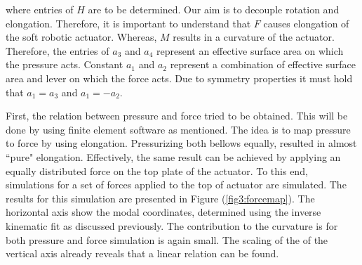 where entries of $H$ are to be determined. Our aim is to decouple rotation and elongation. Therefore, it is important to understand that $F$ causes elongation of the soft robotic actuator. Whereas, $M$ results in a curvature of the actuator. Therefore, the entries of $a_3$ and $a_4$ represent an effective surface area on which the pressure acts. Constant $a_1$ and $a_2$ represent a combination of effective surface area and lever on which the force acts. Due to symmetry properties it must hold that $a_1 = a_3$ and $a_1 = -a_2$.

First, the relation between pressure and force tried to be obtained. This will be done by using finite element software as mentioned. The idea is to map pressure to force by using elongation. Pressurizing both bellows equally, resulted in almost ``pure" elongation. Effectively, the same result can be achieved by applying an equally distributed force on the top plate of the actuator. To this end, simulations for a set of forces applied to the top of actuator are simulated. The results for this simulation are presented in Figure (\ref{fig3:forcemap}). The horizontal axis show the modal coordinates, determined using the inverse kinematic fit as discussed previously. The contribution to the curvature is for both pressure and force simulation is again small. The scaling of the of the vertical axis already reveals that a linear relation can be found.


